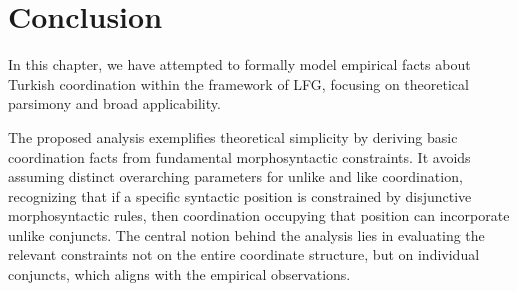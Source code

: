 \section{Conclusion} 

In this chapter, we have attempted to formally model empirical facts about Turkish coordination within the framework of LFG, focusing on theoretical parsimony and broad applicability.

The proposed analysis exemplifies theoretical simplicity by deriving basic coordination facts from fundamental morphosyntactic constraints. It avoids assuming distinct overarching parameters for unlike and like coordination, recognizing that if a specific syntactic position is constrained by disjunctive morphosyntactic rules, then coordination occupying that position can incorporate unlike conjuncts. The central notion behind the analysis lies in evaluating the relevant constraints not on the entire coordinate structure, but on individual conjuncts, which aligns with the empirical observations.

 
